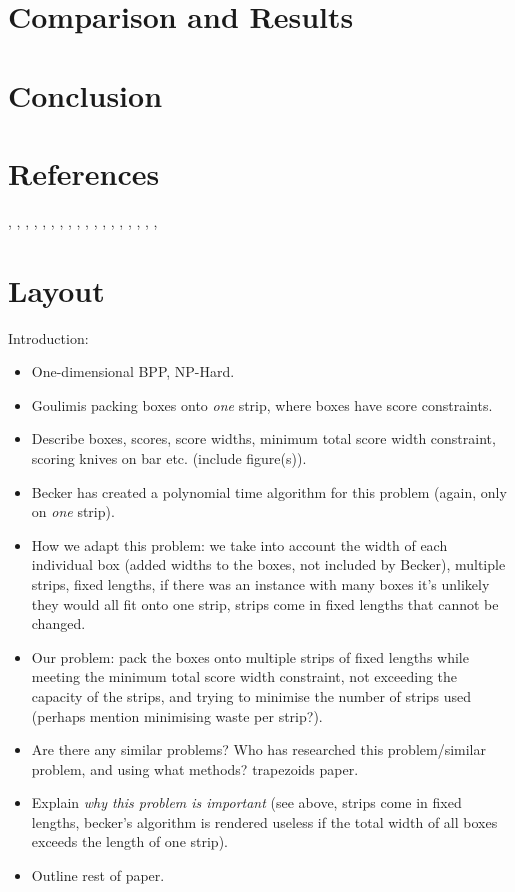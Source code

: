 \documentclass[oribibl]{llncs}
\begin{document}
\section{Comparison and Results}
\label{sec:compresult}


\section{Conclusion}
\label{sec:conclusion}

\section{References}
\cite{becker2010}, \cite{becker2015}, \cite{coffman1978}, \cite{dosa2007}, \cite{eilon1971}, \cite{garey1979}, \cite{gilmore1961}, \cite{gilmore1963}, \cite{goulimis2004}, \cite{johnson1974}, \cite{karp1972}, \cite{korf2002}, \cite{lewis2009}, \cite{lewis2017}, \cite{lewis2011}, \cite{mahadev1994}, \cite{mahadev1995}, \cite{martello1990a}, \cite{martello1990b}

\section{Layout}
Introduction:
\begin{itemize}
	\item One-dimensional BPP, NP-Hard.
	\item Goulimis packing boxes onto \textit{one} strip, where boxes have score constraints.
	\item Describe boxes, scores, score widths, minimum total score width constraint, scoring knives on bar etc. (include figure(s)).
	\item Becker has created a polynomial time algorithm for this problem (again, only on \textit{one} strip).
	\item How we adapt this problem: we take into account the width of each individual box (added widths to the boxes, not included by Becker), multiple strips, fixed lengths, if there was an instance with many boxes it's unlikely they would all fit onto one strip, strips come in fixed lengths that cannot be changed.
	\item Our problem: pack the boxes onto multiple strips of fixed lengths while meeting the minimum total score width constraint, not exceeding the capacity of the strips, and trying to minimise the number of strips used (perhaps mention minimising waste per strip?).
	\item Are there any similar problems? Who has researched this problem/similar problem, and using what methods? \cite{lewis2017} trapezoids paper. 
	\item Explain \textit{why this problem is important} (see above, strips come in fixed lengths, becker's algorithm is rendered useless if the total width of all boxes exceeds the length of one strip).
	\item Outline rest of paper.	
\end{itemize}
\end{document}
